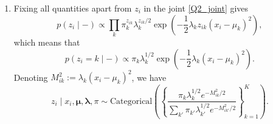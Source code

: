 \documentclass[12pt]{article}
\begin{document}
\begin{enumerate}[label=(\alph*)]
    \item Fixing all quantities apart from $z_i$ in the joint \eqref{Q2_joint}
    gives \[
        p(z_i \mid -)
            \propto \prod_k \pi_k^{z_{ik}} \lambda_k^{z_{ik}/2} \exp\left(-\frac{1}{2}\lambda_k z_{ik}(x_i - \mu_k)^2\right),
    \] which means that \[
        p(z_i = k \mid -)
            \propto \pi_k\lambda_k^{1/2} \exp\left(-\frac{1}{2}\lambda_k (x_i - \mu_k)^2\right).
    \] Denoting $M_{ik}^2 := \lambda_k (x_i - \mu_k)^2$, we have \[
        \boxed{
            z_i \mid x_i, \bm{\mu}, \bm{\lambda}, \pi
                \sim \text{Categorical}\left(\left\{ \frac{\pi_k \lambda_k^{1 /2} e^{-M_{ik}^2 / 2}}{\sum_{k'}\pi_{k'} \lambda_{k'}^{1 /2} e^{-M_{ik'}^2 / 2}} \right\}_{k = 1}^K\right).
        }
    \] 
\end{enumerate}
\end{document}
